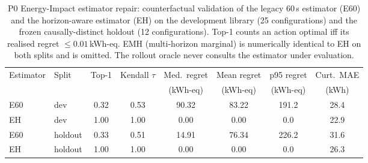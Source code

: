 \begin{table}[t]
\centering\small
\caption{P0 Energy-Impact estimator repair: counterfactual validation of the
legacy 60\,s estimator (E60) and the horizon-aware estimator (EH) on the
development library (25 configurations) and the frozen causally-distinct
holdout (12 configurations). Top-1 counts an action optimal iff its realised
regret $\le 0.01$\,kWh-eq. EMH (multi-horizon marginal) is numerically
identical to EH on both splits and is omitted. The rollout oracle never
consults the estimator under evaluation.}
\label{tab:estimator}
\begin{tabular}{llcccccc}
\toprule
Estimator & Split & Top-1 & Kendall $\tau$ & Med.\ regret & Mean regret &
p95 regret & Curt.\ MAE \\
 & & & & (kWh-eq) & (kWh-eq) & (kWh-eq) & (kWh) \\
\midrule
E60 & dev & 0.32 & 0.53 & 90.32 & 83.22 & 191.2 & 28.4 \\
EH & dev & 1.00 & 1.00 & 0.00 & 0.00 & 0.0 & 22.9 \\
E60 & holdout & 0.33 & 0.51 & 14.91 & 76.34 & 226.2 & 31.6 \\
EH & holdout & 1.00 & 1.00 & 0.00 & 0.00 & 0.0 & 26.3 \\
\bottomrule
\end{tabular}
\end{table}
